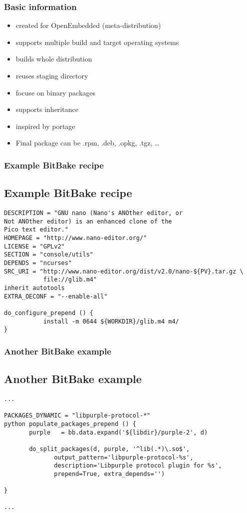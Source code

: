 
\begin{frame}[t]
   \frametitle{Basic information}
   \begin{itemize}
	\item created for OpenEmbedded (meta-distribution)
	\item supports multiple build and target operating systems
	\item builds whole distribution
	\item reuses staging directory
	\item focuse on binary packages
   \item supports inheritance
   \item inspired by portage
	\item Final package can be .rpm, .deb, .opkg, .tgz, \dots
   \end{itemize}
\end{frame}

\begin{frame}[fragile]
	\frametitle{Example BitBake recipe}
	\subsection{Example BitBake recipe}
	\begin{small}
	\begin{verbatim}
DESCRIPTION = "GNU nano (Nano's ANOther editor, or 
Not ANOther editor) is an enhanced clone of the 
Pico text editor."
HOMEPAGE = "http://www.nano-editor.org/"
LICENSE = "GPLv2"
SECTION = "console/utils"
DEPENDS = "ncurses"
SRC_URI = "http://www.nano-editor.org/dist/v2.0/nano-${PV}.tar.gz \
           file://glib.m4"
inherit autotools
EXTRA_OECONF = "--enable-all"

do_configure_prepend () {
           install -m 0644 ${WORKDIR}/glib.m4 m4/
}
	\end{verbatim}
	\end{small}
\end{frame}

\begin{frame}[fragile,t]
	\frametitle{Another BitBake example}
	\subsection{Another BitBake example}
	\begin{small}
	\begin{verbatim}
...

PACKAGES_DYNAMIC = "libpurple-protocol-*"
python populate_packages_prepend () {
       purple   = bb.data.expand('${libdir}/purple-2', d)

       do_split_packages(d, purple, '^lib(.*)\.so$',
              output_pattern='libpurple-protocol-%s',
              description='Libpurple protocol plugin for %s',
              prepend=True, extra_depends='')

}

...
	\end{verbatim}
	\end{small}
\end{frame}
